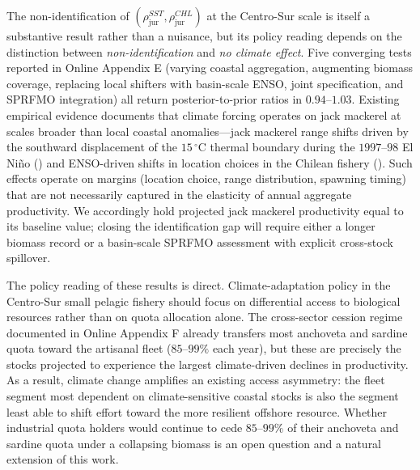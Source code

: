 \documentclass[
  11pt,
]{article}
\begin{document}
The non-identification of \((\rho_{\text{jur}}^{SST}, \rho_{\text{jur}}^{CHL})\) at the Centro-Sur scale is itself a substantive result rather than a nuisance, but its policy reading depends on the distinction between \emph{non-identification} and \emph{no climate effect}. Five converging tests reported in Online Appendix E (varying coastal aggregation, augmenting biomass coverage, replacing local shifters with basin-scale ENSO, joint specification, and SPRFMO integration) all return posterior-to-prior ratios in \(0.94\)--\(1.03\). Existing empirical evidence documents that climate forcing operates on jack mackerel at scales broader than local coastal anomalies---jack mackerel range shifts driven by the southward displacement of the \(15\,^{\circ}\)C thermal boundary during the \(1997\)--\(98\) El Niño () and ENSO-driven shifts in location choices in the Chilean fishery (). Such effects operate on margins (location choice, range distribution, spawning timing) that are not necessarily captured in the elasticity of annual aggregate productivity. We accordingly hold projected jack mackerel productivity equal to its baseline value; closing the identification gap will require either a longer biomass record or a basin-scale SPRFMO assessment with explicit cross-stock spillover.

The policy reading of these results is direct. Climate-adaptation policy in the Centro-Sur small pelagic fishery should focus on differential access to biological resources rather than on quota allocation alone. The cross-sector cession regime documented in Online Appendix F already transfers most anchoveta and sardine quota toward the artisanal fleet (\(85\)--\(99\%\) each year), but these are precisely the stocks projected to experience the largest climate-driven declines in productivity. As a result, climate change amplifies an existing access asymmetry: the fleet segment most dependent on climate-sensitive coastal stocks is also the segment least able to shift effort toward the more resilient offshore resource. Whether industrial quota holders would continue to cede \(85\)--\(99\%\) of their anchoveta and sardine quota under a collapsing biomass is an open question and a natural extension of this work.
\end{document}
